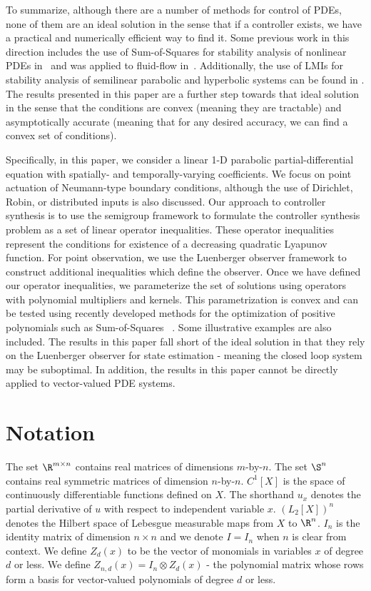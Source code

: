 \documentclass[9pt,journal,twocolumn]{IEEEtran}
\begin{document}
To summarize, although there are a number of methods for control of PDEs, none of them are an ideal solution in the sense that if a controller exists, we have a practical and numerically efficient way to find it. Some previous work in this direction includes the use of Sum-of-Squares for stability analysis of nonlinear PDEs in~\cite{papachristodoulou2005constructing} and was applied to fluid-flow in~\cite{tanaka2009sum}. Additionally, the use of LMIs for stability analysis of semilinear parabolic and hyperbolic systems can be found in \cite{fridman2009lmi}.
The results presented in this paper are a further step towards that ideal solution in the sense that the conditions are convex (meaning they are tractable) and asymptotically accurate (meaning that for any desired accuracy, we can find a convex set of conditions).

Specifically, in this paper, we consider a linear 1-D parabolic partial-differential equation with spatially- and temporally-varying coefficients. We focus on point actuation of Neumann-type boundary conditions, although the use of Dirichlet, Robin, or distributed inputs is also discussed. Our approach to controller synthesis is to use the semigroup framework to formulate the controller synthesis problem as a set of linear operator inequalities. These operator inequalities represent the conditions for existence of a decreasing quadratic Lyapunov function. For point observation, we use the Luenberger observer framework to construct additional inequalities which define the observer. Once we have defined our operator inequalities, we parameterize the set of solutions using operators with polynomial multipliers and kernels. This parametrization is convex and can be tested using recently developed methods for the optimization of positive polynomials such as Sum-of-Squares~ \cite{prajna2001introducing}. Some illustrative examples are also included. The results in this paper fall short of the ideal solution in that they rely on the Luenberger observer for state estimation - meaning the closed loop system may be suboptimal. In addition, the results in this paper cannot be directly applied to vector-valued PDE systems.

\section{Notation}\label{Prelim}
The set $\R^{m \times n}$ contains real matrices of dimensions $m$-by-$n$. The set $\S^n$ contains real symmetric matrices of dimension $n$-by-$n$. $C^1[X]$ is the space of continuously differentiable functions defined on $X$. The shorthand $u_x$ denotes the partial derivative of $u$ with respect to independent variable $x$. $(L_2[X])^n$ denotes the Hilbert space of Lebesgue measurable maps from $X$ to $\R^n$.
$I_n$ is the identity matrix of dimension $n \times n$ and we denote $I=I_n$ when $n$ is clear from context.
We define $Z_d(x)$ to be the vector of monomials in variables $x$ of degree $d$ or less. We define $Z_{n,d}(x)=I_n \otimes Z_d(x)$ - the polynomial matrix whose rows form a basis for vector-valued polynomials of degree $d$ or less.
\end{document}
